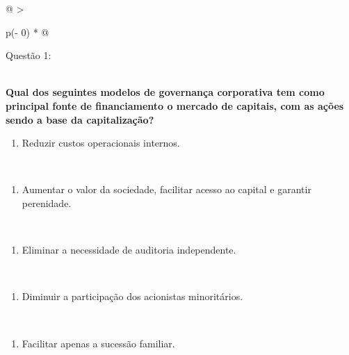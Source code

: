 \documentclass[
]{book}
\providecommand{\tightlist}{%
  \setlength{\itemsep}{0pt}\setlength{\parskip}{0pt}}
\begin{document}
\begin{longtable}[]{@{}
  >{\raggedright\arraybackslash}p{(\columnwidth - 0\tabcolsep) * }@{}}
\toprule\noalign{}
\begin{minipage}[b]{\linewidth}\raggedright
Questão 1:
\end{minipage} \\
\midrule\noalign{}
\endhead
\bottomrule\noalign{}
\endlastfoot
\textbf{Qual dos seguintes modelos de governança corporativa tem como principal fonte de financiamento o mercado de capitais, com as ações sendo a base da capitalização?} \\
\begin{minipage}[t]{\linewidth}\raggedright
\begin{enumerate}
\def\labelenumi{\alph{enumi})}
\tightlist
\item
  Reduzir custos operacionais internos.
\end{enumerate}
\end{minipage} \\
\begin{minipage}[t]{\linewidth}\raggedright
\begin{enumerate}
\def\labelenumi{\alph{enumi})}
\setcounter{enumi}{1}
\tightlist
\item
  Aumentar o valor da sociedade, facilitar acesso ao capital e garantir perenidade. \textbar{}
\end{enumerate}
\end{minipage} \\
\begin{minipage}[t]{\linewidth}\raggedright
\begin{enumerate}
\def\labelenumi{\alph{enumi})}
\setcounter{enumi}{2}
\tightlist
\item
  Eliminar a necessidade de auditoria independente.
\end{enumerate}
\end{minipage} \\
\begin{minipage}[t]{\linewidth}\raggedright
\begin{enumerate}
\def\labelenumi{\alph{enumi})}
\setcounter{enumi}{3}
\tightlist
\item
  Diminuir a participação dos acionistas minoritários.
\end{enumerate}
\end{minipage} \\
\begin{minipage}[t]{\linewidth}\raggedright
\begin{enumerate}
\def\labelenumi{\alph{enumi})}
\setcounter{enumi}{4}
\tightlist
\item
  Facilitar apenas a sucessão familiar.
\end{enumerate}
\end{minipage} \\
\end{longtable}
\end{document}
